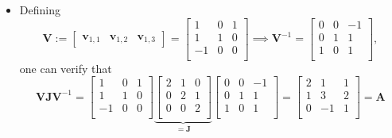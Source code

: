 \documentclass[12pt,a4paper]{article}
\begin{document}
\begin{itemize}
\begin{itemize}
  \item Defining
    \begin{equation}\nonumber%
      \bm{V} :=
      \begin{bmatrix}
        \bm{v}_{1,1} & \bm{v}_{1,2} & \bm{v}_{1,3}
      \end{bmatrix}
      =
      \begin{bmatrix}
        1 & 0 & 1 \\
        1 & 1 & 0 \\
        -1 & 0 & 0 \\
      \end{bmatrix}
      \implies
      \bm{V}^{-1}
      = 
      \begin{bmatrix}
        0 & 0 & -1 \\
        0 & 1 & 1 \\
        1 & 0 & 1 \\
      \end{bmatrix},
    \end{equation}
    one can verify that
    \begin{equation}\nonumber%
      \bm{V}\bm{J}\bm{V}^{-1}
      =
      \begin{bmatrix}
        1 & 0 & 1 \\
        1 & 1 & 0 \\
        -1 & 0 & 0 \\
      \end{bmatrix}
      \underbrace{
      \begin{bmatrix}
        2 & 1 & 0 \\
        0 & 2 & 1 \\
        0 & 0 & 2 \\
      \end{bmatrix}}_{=\bm{J}}
      \begin{bmatrix}
        0 & 0 & -1 \\
        0 & 1 & 1 \\
        1 & 0 & 1 \\
      \end{bmatrix}
      =
      \begin{bmatrix}
        2 & 1 & 1 \\
        1 & 3 & 2 \\
        0 & -1 & 1 \\
      \end{bmatrix}
      = \bm{A}
    \end{equation}

  \end{itemize}


\end{itemize}
\end{document}
